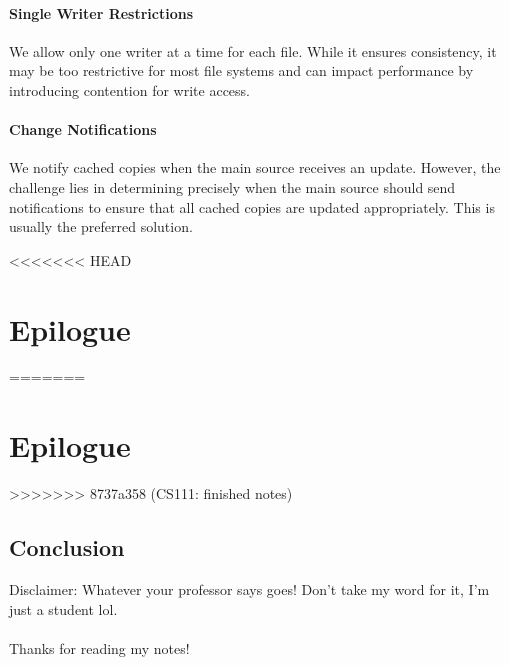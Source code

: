 \documentclass{report}
\begin{document}
\subsection{Single Writer Restrictions}
We allow only one writer at a time for each file. While it ensures consistency, it may be too
restrictive for most file systems and can impact performance by introducing contention for write
access. 


\subsection{Change Notifications}
We notify cached copies when the main source receives an update. However, the
challenge lies in determining precisely when the main source should send notifications to ensure
that all cached copies are updated appropriately. This is usually the preferred solution.










<<<<<<< HEAD
\begingroup
\renewcommand\thepart{\Alph{part}.} %
\part{Epilogue}
\endgroup
=======
\part*{Epilogue}
>>>>>>> 8737a358 (CS111: finished notes)
\chapter{Conclusion}
Disclaimer: Whatever your professor says goes! Don't take my word for it, I'm just a student
lol. \\ \\
Thanks for reading my notes!
\end{document}
